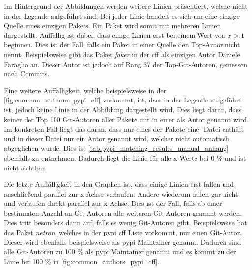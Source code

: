 Im Hintergrund der Abbildungen werden weitere Linien präsentiert, welche nicht in der Legende aufgeführt sind.
Bei jeder Linie handelt es sich um eine einzige Quelle eines einzigen Pakets.
Ein Paket wird somit mit mehreren Linien dargestellt.
Auffällig ist dabei, dass einige Linien erst bei einem Wert von $x>1$ beginnen.
Dies ist der Fall, falls ein Paket in einer Quelle den Top-Autor nicht nennt.
Beispielsweise gibt das Paket \emph{faker} in der \gls{cff} als einzigen Autor \glqq Daniele Faraglia\grqq{} an.
Dieser Autor ist jedoch auf Rang 37 der Top-Git-Autoren, gemessen nach Commits.

Eine weitere Auffälligkeit, welche beispielsweise in der \autoref{fig:common_authors_pypi_cff} vorkommt, ist, dass in der Legende  aufgeführt ist, jedoch keine Linie in der Abbildung dargestellt wird.
Dies liegt daran, dass keiner der Top 100 Git-Autoren aller Pakete mit  in einer  als Autor genannt wird.
Im konkreten Fall liegt das daran, dass nur eines der Pakete eine -Datei enthält und in dieser Datei nur ein Autor genannt wird, welcher nicht automatisch abgeglichen wurde.
Dies ist \autoref{tab:pypi_matching_results_manual_anhang} ebenfalls zu entnehmen.
Dadurch liegt die Linie für alle x-Werte bei 0 \% und ist nicht sichtbar.

Die letzte Auffälligkeit in den Graphen ist, dass einige Linien erst fallen und anschließend parallel zur x-Achse verlaufen.
Andere wiederum fallen gar nicht und verlaufen direkt parallel zur x-Achse.
Dies ist der Fall, falls ab einer bestimmten Anzahl an Git-Autoren alle weiteren Git-Autoren genannt werden.
Dies tritt besonders dann auf, falls es wenig Git-Autoren gibt.
Beispielsweise hat das Paket \emph{netron}, welches in der \gls{pypi} \gls{cff} Liste vorkommt, nur einen Git-Autor.
Dieser wird ebenfalls beispielsweise als \gls{pypi} Maintainer genannt.
Dadurch sind alle Git-Autoren zu 100 \% als \gls{pypi} Maintainer genannt und es kommt zu der Linie bei 100 \% in \autoref{fig:common_authors_pypi_cff}.


